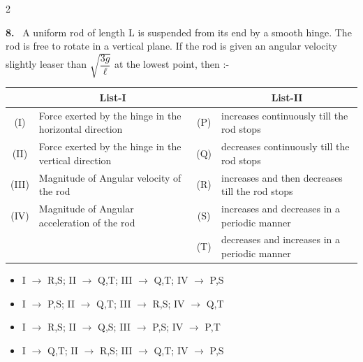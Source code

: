\documentclass[10pt]{extarticle}
\newcommand{\qn}[1]{\par\smallskip\noindent\textbf{#1.}~}
\newenvironment{qoptions}{\begin{itemize}[leftmargin=1.8em,itemsep=1pt,topsep=2pt,label={}]}{\end{itemize}}
\newcommand{\opt}[2]{\item[(#1)] #2}
\begin{document}
\begin{multicols}{2}
\qn{8} A uniform rod of length L is suspended from its end by a smooth hinge. The rod is free to rotate in a vertical plane. If the rod is given an angular velocity slightly leaser than $\sqrt{\dfrac{3g}{\ell}}$ at the lowest point, then :-\par\nobreak
\begin{center}\small\setlength{\tabcolsep}{3pt}
\begin{tabular}{|c|p{2.6cm}|c|p{2.6cm}|}
\hline
 & \multicolumn{1}{c|}{\textbf{List-I}} & & \multicolumn{1}{c|}{\textbf{List-II}} \\
\hline
(I) & Force exerted by the hinge in the horizontal direction & (P) & increases continuously till the rod stops \\
\hline
(II) & Force exerted by the hinge in the vertical direction & (Q) & decreases continuously till the rod stops \\
\hline
(III) & Magnitude of Angular velocity of the rod & (R) & increases and then decreases till the rod stops \\
\hline
(IV) & Magnitude of Angular acceleration of the rod & (S) & increases and decreases in a periodic manner \\
\hline
 & & (T) & decreases and increases in a periodic manner \\
\hline
\end{tabular}
\end{center}
\begin{qoptions}
\opt{A}{I $\to$ R,S; II $\to$ Q,T; III $\to$ Q,T; IV $\to$ P,S}
\opt{B}{I $\to$ P,S; II $\to$ Q,T; III $\to$ R,S; IV $\to$ Q,T}
\opt{C}{I $\to$ R,S; II $\to$ Q,S; III $\to$ P,S; IV $\to$ P,T}
\opt{D}{I $\to$ Q,T; II $\to$ R,S; III $\to$ Q,T; IV $\to$ P,S}
\end{qoptions}


\end{multicols}
\end{document}
